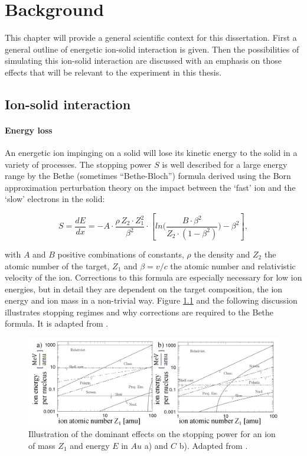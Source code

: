 \chapter{Background}

This chapter will provide a general scientific context for this dissertation. First a general outline of energetic ion-solid interaction is given. Then the possibilities of simulating this ion-solid interaction are discussed with an emphasis on those effects that will be relevant to the experiment in this thesis. 

\section{Ion-solid interaction}
\label{sec:ionsolid}

\subsubsection{Energy loss}

An energetic ion impinging on a solid will lose its kinetic energy to the solid in a variety of processes. The stopping power $S$ is well described for a large energy range by the Bethe (sometimes ``Bethe-Bloch'') formula derived using the Born approximation perturbation theory on the impact between the `fast' ion and the `slow' electrons in the solid: 

\begin{equation}
S = \frac{dE}{dx} = - A \cdot \frac{\rho\,Z_2\cdot Z_1^2}{\beta^2} \cdot \left[ln\Big(\frac{B\cdot\beta^2}{Z_2\cdot(1-\beta^2)}\Big)-\beta^2\right] ,
\end{equation}


with $A$ and $B$ positive combinations of constants, $\rho$ the density and $Z_2$ the atomic number of the target, $Z_1$ and $\beta = v/c$ the atomic number and relativistic velocity of the ion. Corrections to this formula are especially necessary for low ion energies, but in detail they are dependent on the target composition, the ion energy and ion mass in a non-trivial way. Figure \ref{stopping} and the following discussion illustrates stopping regimes and why corrections are required to the Bethe formula. It is adapted from \cite{sigmund_stopping_2004}.

\begin{figure}
	\centering
		\includegraphics[width=.95\textwidth]{images/StoppinginAuandC.png}
	\caption{Illustration of the dominant effects on the stopping power for an ion of mass $Z_1$ and energy $E$ in $Au$ a) and $C$ b). Adapted from \cite{sigmund_stopping_2004}.} 
	\label{stopping}
\end{figure} 

